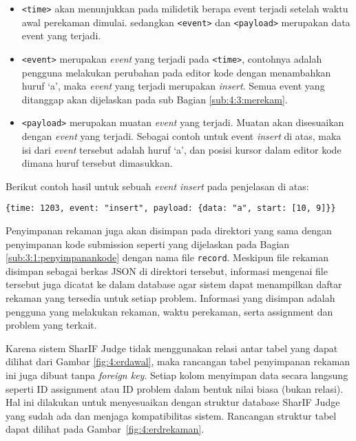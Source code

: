 \begin{itemize}
    \item \verb|<time>| akan menunjukkan pada milidetik berapa event terjadi setelah waktu awal perekaman dimulai. sedangkan \verb|<event>| dan \verb|<payload>| merupakan data event yang terjadi.

    \item \verb|<event>| merupakan \textit{event} yang terjadi pada \verb|<time>|, contohnya adalah pengguna melakukan perubahan pada editor kode dengan menambahkan huruf `a', maka \textit{event} yang terjadi merupakan \textit{insert}. Semua event yang ditanggap akan dijelaskan pada sub Bagian \ref{sub:4:3:merekam}.

    \item \verb|<payload>| merupakan muatan \textit{event} yang terjadi. Muatan akan disesuaikan dengan \textit{event} yang terjadi. Sebagai contoh untuk event \textit{insert} di atas, maka isi dari \textit{event} tersebut adalah huruf `a', dan posisi kursor dalam editor kode dimana huruf tersebut dimasukkan.
\end{itemize}

Berikut contoh hasil untuk sebuah \textit{event insert} pada penjelasan di atas:

\begin{center}
    \verb|{time: 1203, event: "insert", payload: {data: "a", start: [10, 9]}}|
\end{center}

Penyimpanan rekaman juga akan disimpan pada direktori yang sama dengan penyimpanan kode submission seperti yang dijelaskan pada Bagian \ref{sub:3:1:penyimpanankode} dengan nama file \verb|record|.
Meskipun file rekaman disimpan sebagai berkas JSON di direktori tersebut, informasi mengenai file tersebut juga dicatat ke dalam database agar sistem dapat menampilkan daftar rekaman yang tersedia untuk setiap problem. Informasi yang disimpan adalah pengguna yang melakukan rekaman, waktu perekaman, serta assignment dan problem yang terkait.

Karena sistem SharIF Judge tidak menggunakan relasi antar tabel yang dapat dilihat dari Gambar \ref{fig:4:erdawal}, maka rancangan tabel penyimpanan rekaman ini juga dibuat tanpa \textit{foreign key}. Setiap kolom menyimpan data secara langsung seperti ID assignment atau ID problem dalam bentuk nilai biasa (bukan relasi). Hal ini dilakukan untuk menyesuaikan dengan struktur database SharIF Judge yang sudah ada dan menjaga kompatibilitas sistem. Rancangan struktur tabel dapat dilihat pada Gambar~\ref{fig:4:erdrekaman}.

